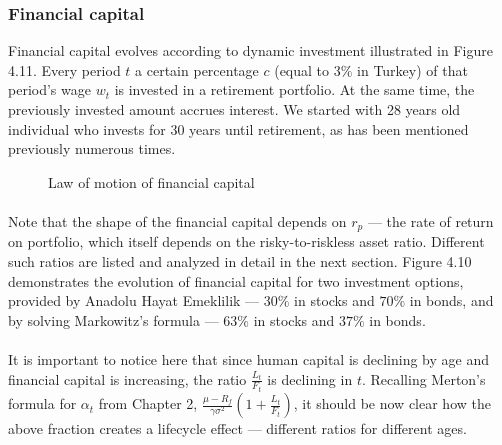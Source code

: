 \documentclass[]{elsarticle}
\begin{document}
\subsubsection{Financial capital}

Financial capital evolves according to dynamic investment illustrated in Figure 4.11. Every period $t$ a certain percentage $c$ (equal to $3\%$ in Turkey) of that period's wage $w_t$ is invested in a retirement portfolio. At the same time, the previously invested amount accrues interest. We started with 28 years old individual who invests for 30 years until retirement, as has been mentioned previously numerous times.

\begin{figure}[h]
	\centering
	\caption{Law of motion of financial capital}
\end{figure}

\paragraph{}Note that the shape of the financial capital depends on $r_p$ --- the rate of return on portfolio, which itself depends on the risky-to-riskless asset ratio. Different such ratios are listed and analyzed in detail in the next section. Figure 4.10 demonstrates the evolution of financial capital for two investment options, provided by Anadolu Hayat Emeklilik --- $30\%$ in stocks and $70\%$ in bonds, and by solving Markowitz's formula --- $63\%$ in stocks and $37\%$ in bonds.

\paragraph{}It is important to notice here that since human capital is declining by age and financial capital is increasing, the ratio $\frac{L_t}{F_t}$ is declining in $t$. Recalling Merton's formula for $\alpha_t$ from Chapter 2, $\frac{\mu - R_f}{\gamma \sigma^2}(1+\frac{L_t}{F_t})$, it should be now clear how the above fraction creates a lifecycle effect --- different ratios for different ages. 
\end{document}
